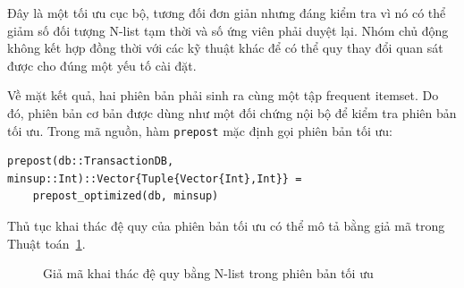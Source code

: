 Đây là một tối ưu cục bộ, tương đối đơn giản nhưng đáng kiểm tra vì nó có thể
giảm số đối tượng N-list tạm thời và số ứng viên phải duyệt lại. Nhóm chủ động
không kết hợp đồng thời với các kỹ thuật khác để có thể quy thay đổi quan sát
được cho đúng một yếu tố cài đặt.

Về mặt kết quả, hai phiên bản phải sinh ra cùng một tập frequent itemset. Do đó, phiên bản cơ bản được dùng như một đối chứng nội bộ để kiểm tra phiên bản tối ưu. Trong mã nguồn, hàm \texttt{prepost} mặc định gọi phiên bản tối ưu:

\begin{lstlisting}[caption={Hàm PrePost mặc định}, label={lst:prepost-default}]
prepost(db::TransactionDB, minsup::Int)::Vector{Tuple{Vector{Int},Int}} =
    prepost_optimized(db, minsup)
\end{lstlisting}

Thủ tục khai thác đệ quy của phiên bản tối ưu có thể mô tả bằng giả mã trong Thuật toán~\ref{alg:implementation-mining}.

\begin{figure}[H]
\centering
{}
\caption{Giả mã khai thác đệ quy bằng N-list trong phiên bản tối ưu}
\label{alg:implementation-mining}
\end{figure}

